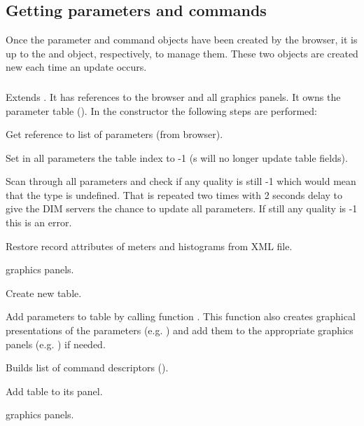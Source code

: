 \subsection{Getting parameters and commands}
Once the parameter and command objects have been created by the browser, it is up to the 
 and  object, respectively, to manage them.
These two objects are created new each time an update occurs.
\subsubsection{}
Extends .
It has references to the browser and all graphics panels. It owns the parameter table
(). In the constructor the following steps are performed:
\bnum
\item Get reference to list of parameters (from browser).
\item Set in all parameters the table index to -1 (s will no longer update
table fields).
\item Scan through all parameters and check if any quality is still -1 which would mean
that the type is undefined. That is repeated two times with 2 seconds delay to give
the DIM servers the chance to update all parameters. If still any quality is -1 this is an error.
\item Restore record attributes of meters and histograms from XML file.
\item {} graphics panels.
\item Create new table.
\item Add parameters to table by calling function . This function
also creates graphical presentations of the parameters (e.g. ) and add them to the appropriate graphics panels (e.g. ) if needed.
\item Builds list of command descriptors ().
\item Add table to its panel.
\item {} graphics panels.
\enum
